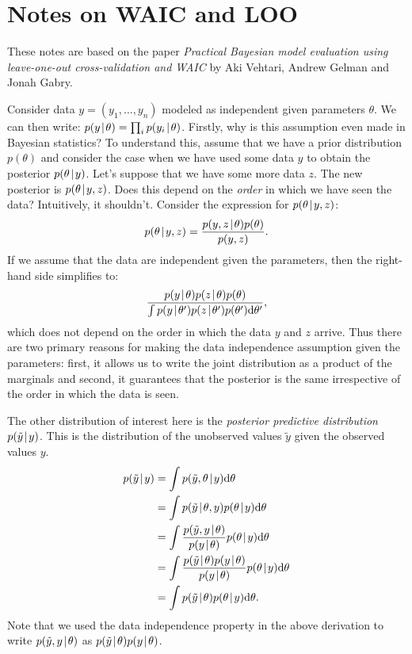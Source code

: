 \chapter{Notes on WAIC and LOO}

These notes are based on the paper \emph{Practical Bayesian model evaluation 
using leave-one-out cross-validation and WAIC} by Aki Vehtari, Andrew Gelman and 
Jonah Gabry.

Consider data $y = (y_1, \ldots, y_n)$ modeled as independent given parameters $\theta$. 
We can then write: $p(y \! \mid \! \theta) = \prod_{i} p(y_i \! \mid \! \theta)$. Firstly, 
why is this assumption even made in Bayesian statistics? To understand this, 
assume that we have a prior distribution $p(\theta)$ and consider
the case when we have used some data $y$ to obtain the posterior 
$p(\theta \! \mid \! y)$. Let's suppose that we have some more data $z$. The new posterior 
is $p(\theta \! \mid \! y, z)$. Does this depend on the \emph{order} in which we have 
seen the data? Intuitively, it shouldn't. Consider the expression for $p(\theta \! \mid \! y, z)$:
\[
    p(\theta \! \mid \! y, z) = \frac{p(y, z \! \mid \! \theta) p(\theta)}{p(y, z)}.
\]
If we assume that the data are independent given the parameters, then the 
right-hand side simplifies to:
\[
    \frac{p(y \mymid \theta) p(z \mymid \theta) p(\theta)}
    {\int p(y \mymid \theta') p(z \mymid \theta') p(\theta') \dx \theta'},
\]
which does not depend on the order in which the data $y$ and $z$ arrive. Thus 
there are two primary reasons for making the data independence assumption 
given the parameters: first, it allows us to write the joint distribution as a product
of the marginals and second, it guarantees that the posterior is the same irrespective 
of the order in which the data is seen. 

The other distribution of interest here is the \emph{posterior predictive distribution} 
$p(\tilde{y} \! \mid \! y)$. This is the distribution of the unobserved values $\tilde{y}$ 
given the observed values $y$. 
\begin{align*}
    p(\tilde{y} \mymid y) & = \int p(\tilde{y}, \theta \mymid y) \dx \theta \\
        & = \int p(\tilde{y} \mymid \theta, y) p(\theta \mymid y) \dx \theta \\
        & = \int \frac{p(\tilde{y}, y \mymid \theta)}{p(y \mymid \theta)} p(\theta \mymid y) \dx \theta \\
        & = \int \frac{p(\tilde{y} \mymid \theta) p(y \mymid \theta)}{p(y \mymid \theta)}  p(\theta \mymid y) \dx \theta \\
        & = \int p(\tilde{y} \mymid \theta) p(\theta \mymid y) \dx \theta.
\end{align*}
Note that we used the data independence property in the above derivation 
to write $p(\tilde{y}, y \! \mid \! \theta)$ as $p(\tilde{y} \! \mid \! \theta) p(y \! \mid \! \theta)$.

